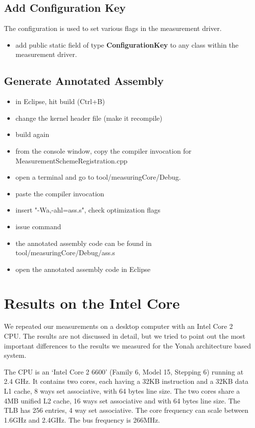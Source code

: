 \documentclass[a4paper,12pt]{report}
\newcommand{\class}[1]{\textbf{#1}}
\begin{document}
\section{Add Configuration Key}
The configuration is used to set various flags in the measurement driver.
\begin{itemize}
\item add public static field of type \class{ConfigurationKey} to any class within the
measurement driver.
\end{itemize}

\section{Generate Annotated Assembly}
\begin{itemize}
\item in Eclipse, hit build (Ctrl+B)
\item change the kernel header file (make it recompile)
\item build again
\item from the console window, copy the compiler invocation for
MeasurementSchemeRegistration.cpp
\item open a terminal and go to tool/measuringCore/Debug.
\item paste the compiler invocation
\item insert "-Wa,-ahl=ass.s", check optimization flags
\item issue command
\item the annotated assembly code can be found in tool/measuringCore/Debug/ass.s
\item open the annotated assembly code in Eclipse
\end{itemize}

\chapter{Results on the Intel Core}
\label{sec:resultsIntelCore}
We repeated our measurements on a desktop computer with an Intel Core 2 CPU. The
results are not discussed in detail, but we tried to point out the most
important differences to the results we measured for the Yonah architecture
based system.

The CPU is an `Intel Core 2 6600' (Family 6, Model 15, Stepping 6) running at
2.4 GHz. It contains two cores, each having a 32KB instruction and a 32KB data
L1 cache, 8 ways set associative, with 64 bytes line size. The two cores share a
4MB unified L2 cache, 16 ways set associative and with 64 bytes line size. The
TLB has 256 entries, 4 way set associative. The core frequency can scale between
1.6GHz and 2.4GHz. The bus frequency is 266MHz.
\end{document}
